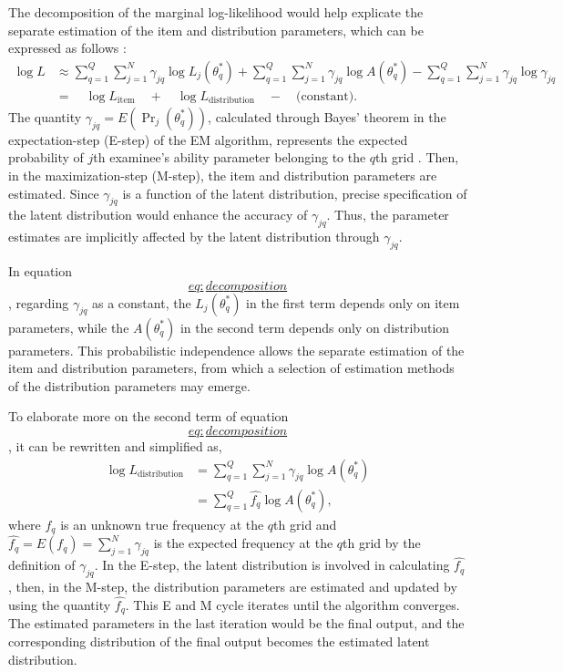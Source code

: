The decomposition of the marginal log-likelihood would help explicate
the separate estimation of the item and distribution parameters, which
can be expressed as follows \citep{Li:2021}: \[\begin{split}
\log L &\approx \sum_{q = 1}^{Q}{ \sum_{j = 1}^{N}
{ \gamma_{jq} \log{L_j{\left( \theta^{*}_{q} \right)}} } } +
\sum_{q = 1}^{Q}{ \sum_{j = 1}^{N}
{ \gamma_{jq} \log{A{\left( \theta^{*}_{q} \right)}} } } -
\sum_{q = 1}^{Q}{ \sum_{j = 1}^{N}{ \gamma_{jq} \log{\gamma_{jq}} } } \\
&= \quad \log{L_{\text{item}}} \quad
+ \quad \log{L_{\text{distribution}}} \quad - \quad \text{(constant)} .
\end{split}
\label{eq:decomposition}\] The quantity
\(\gamma_{jq} = E{\left(\Pr_{j}{\left( \theta_{q}^{*} \right)}\right)}\),
calculated through Bayes' theorem in the expectation-step (E-step) of
the EM algorithm, represents the expected probability of \(j\)th
examinee's ability parameter belonging to the \(q\)th grid \citep[see][]{Baker+Kim:2004}. Then, in the maximization-step (M-step), the item and
distribution parameters are estimated. Since \(\gamma_{jq}\) is a function
of the latent distribution, precise specification of the latent
distribution would enhance the accuracy of \(\gamma_{jq}\). Thus, the
parameter estimates are implicitly affected by the latent distribution
through \(\gamma_{jq}\).

In equation
\protect\hyperlink{eq:decomposition}{\[eq:decomposition\]}, regarding \(\gamma_{jq}\) as a constant,
the \(L_j{\left( \theta^{*}_{q} \right)}\) in the first term depends only
on item parameters, while the \(A{\left( \theta^{*}_{q} \right)}\) in the
second term depends only on distribution parameters. This probabilistic
independence allows the separate estimation of the item and distribution
parameters, from which a selection of estimation methods of the
distribution parameters may emerge.

To elaborate more on the second term of equation
\protect\hyperlink{eq:decomposition}{\[eq:decomposition\]}, it can be rewritten and simplified as,
\[\begin{split}
\log{L_{\text{distribution}}}
&= \sum_{q = 1}^{Q}{ \sum_{j = 1}^{N}
{ \gamma_{jq} \log{A{\left( \theta^{*}_{q} \right)}} } } \\
&= \sum_{q = 1}^{Q}{ \hat{f_{q}} \log{A{\left( \theta^{*}_{q} \right)}} },
\end{split}
\label{eq:llikelidist}\] where \(f_q\) is an unknown true frequency at the
\(q\)th grid and
\(\hat{f_q} = E{\left( f_q \right)} = \sum_{j = 1}^{N}{\gamma_{jq}}\) is
the expected frequency at the \(q\)th grid by the definition of
\(\gamma_{jq}\). In the E-step, the latent distribution is involved in
calculating \(\hat{f_q}\), then, in the M-step, the distribution
parameters are estimated and updated by using the quantity \(\hat{f_q}\).
This E and M cycle iterates until the algorithm converges. The estimated
parameters in the last iteration would be the final output, and the
corresponding distribution of the final output becomes the estimated
latent distribution.


